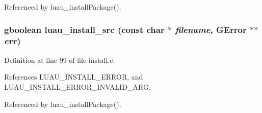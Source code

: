 Referenced by luau\_\-install\-Package().
\subsubsection{\setlength{\rightskip}{0pt plus 5cm}gboolean luau\_\-install\_\-src (const char $\ast$ {\em filename}, GError $\ast$$\ast$ {\em err})}\label{install_8c_a2}




Definition at line 99 of file install.c.

References LUAU\_\-INSTALL\_\-ERROR, and LUAU\_\-INSTALL\_\-ERROR\_\-INVALID\_\-ARG.

Referenced by luau\_\-install\-Package().